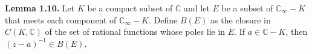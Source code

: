 \textbf{Lemma 1.10.} Let $K$ be a compact subset of $\mathbb{C}$ and let $E$ be a subset of $\mathbb{C}_\infty - K$ that meets each component of $\mathbb{C}_\infty - K$. Define $B(E)$ as the closure in $C(K, \mathbb{C})$ of the set of rational functions whose poles lie in $E$. If $a \in \mathbb{C} - K$, then $(z - a)^{-1} \in B(E)$.
